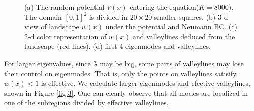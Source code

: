 \documentclass[12pt,a4paper]{article}
\begin{document}
\begin{figure}[h]
\centering
{}
\caption{(a) The random potential $V(x)$ entering the equation($K = 8000$). The domain $[0,1]^2$ is divided in $20 \times 20$ smaller squares. (b) 3-d view of landscape $w(x)$ under the potential and Neumann BC. (c) 2-d color representation of $w(x)$ and valleylines deduced from the landscape (red lines). (d) first 4 eigenmodes and valleylines.}
\label{fig:2}
\end{figure}


For larger eigenvalues, since $\lambda$ may be big, some parts of valleylines may lose their control on eigenmodes. That is, only the points on valleylines satisify $w(x) < 1$ is effective. We calculate larger eigenmodes and efective valleylines, shown in Figure \ref{fig:3}. One can clearly observe that all modes are localized in one of the subregions divided by effective valleylines.
\end{document}
